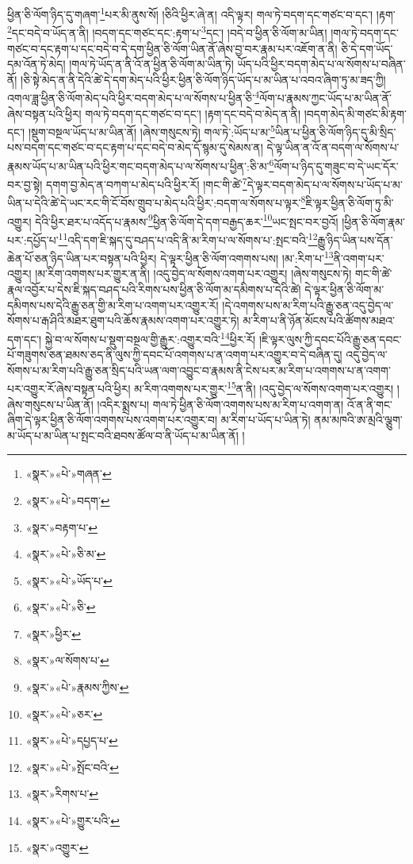 ཕྱིན་ཅི་ལོག་ཉིད་དུ་གཞག་\footnote{«སྣར་»«པེ་»གཞན་}པར་མི་ནུས་སོ། །ཅིའི་ཕྱིར་ཞེ་ན། འདི་ལྟར། གལ་ཏེ་བདག་དང་གཙང་བ་དང་། །རྟག་\footnote{«སྣར་»«པེ་»བདག་}དང་བདེ་བ་ཡོད་ན་ནི། །བདག་དང་གཙང་དང་:རྟག་པ་\footnote{«སྣར་»བརྟག་པ་}དང་། །བདེ་བ་ཕྱིན་ཅི་ལོག་མ་ཡིན། །གལ་ཏེ་བདག་དང་གཙང་བ་དང་རྟག་པ་དང་བདེ་བ་དེ་དག་ཕྱིན་ཅི་ལོག་ཡིན་ནོ་ཞེས་བྱ་བར་རྣམ་པར་འཇོག་ན་ནི། ཅི་དེ་དག་ཡོད་དམ་འོན་ཏེ་མེད། །གལ་ཏེ་ཡོད་ན་ནི་འོ་ན་ཕྱིན་ཅི་ལོག་མ་ཡིན་ཏེ། ཡོད་པའི་ཕྱིར་བདག་མེད་པ་ལ་སོགས་པ་བཞིན་ནོ། །ཅི་སྟེ་མེད་ན་ནི་དེའི་ཚེ་དེ་དག་མེད་པའི་ཕྱིར་ཕྱིན་ཅི་ལོག་ཉིད་ཡོད་པ་མ་ཡིན་པ་འབའ་ཞིག་ཏུ་མ་ཟད་ཀྱི། འགལ་ཟླ་ཕྱིན་ཅི་ལོག་མེད་པའི་ཕྱིར་བདག་མེད་པ་ལ་སོགས་པ་ཕྱིན་ཅི་\footnote{«སྣར་»«པེ་»ཅི་མ་}ལོག་པ་རྣམས་ཀྱང་ཡོད་པ་མ་ཡིན་ནོ་ཞེས་བསྟན་པའི་ཕྱིར། གལ་ཏེ་བདག་དང་གཙང་བ་དང་། །རྟག་དང་བདེ་བ་མེད་ན་ནི། །བདག་མེད་མི་གཙང་མི་རྟག་དང་། །སྡུག་བསྔལ་ཡོད་པ་མ་ཡིན་ནོ། །ཞེས་གསུངས་ཏེ། གལ་ཏེ་:ཡོད་པ་མ་\footnote{«སྣར་»«པེ་»ཡོད་པ་}ཡིན་པ་ཕྱིན་ཅི་ལོག་ཉིད་དུ་མི་སྲིད་པས་བདག་དང་གཙང་བ་དང་རྟག་པ་དང་བདེ་བ་མེད་དོ་སྙམ་དུ་སེམས་ན། དེ་ལྟ་ཡིན་ན་འོ་ན་བདག་ལ་སོགས་པ་རྣམས་ཡོད་པ་མ་ཡིན་པའི་ཕྱིར་གང་བདག་མེད་པ་ལ་སོགས་པ་ཕྱིན་:ཅི་མ་\footnote{«སྣར་»«པེ་»ཅི་}ལོག་པ་ཉིད་དུ་གཟུང་བ་དེ་ཡང་དོར་བར་བྱ་སྟེ། དགག་བྱ་མེད་ན་བཀག་པ་མེད་པའི་ཕྱིར་རོ། །གང་གི་ཚེ་\footnote{«སྣར་»ཕྱིར་}དེ་ལྟར་བདག་མེད་པ་ལ་སོགས་པ་ཡོད་པ་མ་ཡིན་པ་དེའི་ཚེ་དེ་ཡང་རང་གི་ངོ་བོས་གྲུབ་པ་མེད་པའི་ཕྱིར་:བདག་ལ་སོགས་པ་ལྟར་\footnote{«སྣར་»ལ་སོགས་པ་}ཇི་ལྟར་ཕྱིན་ཅི་ལོག་ཏུ་མི་འགྱུར། དེའི་ཕྱིར་ཐར་པ་འདོད་པ་རྣམས་\footnote{«སྣར་»«པེ་»རྣམས་ཀྱིས་}ཕྱིན་ཅི་ལོག་དེ་དག་བརྒྱད་ཆར་\footnote{«སྣར་»«པེ་»ཅར་}ཡང་སྤང་བར་བྱའོ། །ཕྱིན་ཅི་ལོག་རྣམ་པར་:དཔྱོད་པ་\footnote{«སྣར་»«པེ་»དཔྱད་པ་}འདི་དག་ཇི་སྐད་དུ་བཤད་པ་འདི་ནི་མ་རིག་པ་ལ་སོགས་པ་:སྤང་བའི་\footnote{«སྣར་»«པེ་»སྤོང་བའི་}རྒྱུ་ཉིད་ཡིན་པས་དོན་ཆེན་པོ་ཅན་ཉིད་ཡིན་པར་བསྟན་པའི་ཕྱིར། དེ་ལྟར་ཕྱིན་ཅི་ལོག་འགགས་པས། །མ་:རིག་པ་\footnote{«སྣར་»རིགས་པ་}ནི་འགག་པར་འགྱུར། །མ་རིག་འགགས་པར་གྱུར་ན་ནི། །འདུ་བྱེད་ལ་སོགས་འགག་པར་འགྱུར། །ཞེས་གསུངས་ཏེ། གང་གི་ཚེ་རྣལ་འབྱོར་པ་དེས་ཇི་སྐད་བཤད་པའི་རིགས་པས་ཕྱིན་ཅི་ལོག་མ་དམིགས་པ་དེའི་ཚེ། དེ་ལྟར་ཕྱིན་ཅི་ལོག་མ་དམིགས་པས་དེའི་རྒྱུ་ཅན་གྱི་མ་རིག་པ་འགག་པར་འགྱུར་རོ། །དེ་འགགས་པས་མ་རིག་པའི་རྒྱུ་ཅན་འདུ་བྱེད་ལ་སོགས་པ་རྒ་ཤིའི་མཐར་ཐུག་པའི་ཆོས་རྣམས་འགག་པར་འགྱུར་ཏེ། མ་རིག་པ་ནི་ཉོན་མོངས་པའི་ཚོགས་མཐའ་དག་དང་། སྐྱེ་བ་ལ་སོགས་པ་སྡུག་བསྔལ་གྱི་རྒྱུར་:འགྱུར་བའི་\footnote{«སྣར་»«པེ་»གྱུར་པའི་}ཕྱིར་རོ། །ཇི་ལྟར་ལུས་ཀྱི་དབང་པོའི་རྒྱུ་ཅན་དབང་པོ་གཟུགས་ཅན་ཐམས་ཅད་ནི་ལུས་ཀྱི་དབང་པོ་འགགས་པ་ན་འགག་པར་འགྱུར་བ་དེ་བཞིན་དུ། འདུ་བྱེད་ལ་སོགས་པ་མ་རིག་པའི་རྒྱུ་ཅན་སྲིད་པའི་ཡན་ལག་འབྱུང་བ་རྣམས་ནི་ངེས་པར་མ་རིག་པ་འགགས་པ་ན་འགག་པར་འགྱུར་རོ་ཞེས་བསྟན་པའི་ཕྱིར། མ་རིག་འགགས་པར་གྱུར་\footnote{«སྣར་»འགྱུར་}ན་ནི། །འདུ་བྱེད་ལ་སོགས་འགག་པར་འགྱུར། །ཞེས་གསུངས་པ་ཡིན་ནོ། །འདིར་སྨྲས་པ། གལ་ཏེ་ཕྱིན་ཅི་ལོག་འགགས་པས་མ་རིག་པ་འགག་ན། འོ་ན་ནི་གང་ཞིག་དེ་ལྟར་ཕྱིན་ཅི་ལོག་འགགས་པས་འགག་པར་འགྱུར་བ། མ་རིག་པ་ཡོད་པ་ཡིན་ཏེ། ནམ་མཁའི་ཨ་མྲའི་ལྕུག་མ་ཡོད་པ་མ་ཡིན་པ་སྤང་བའི་ཐབས་ཚོལ་བ་ནི་ཡོད་པ་མ་ཡིན་ནོ། །
